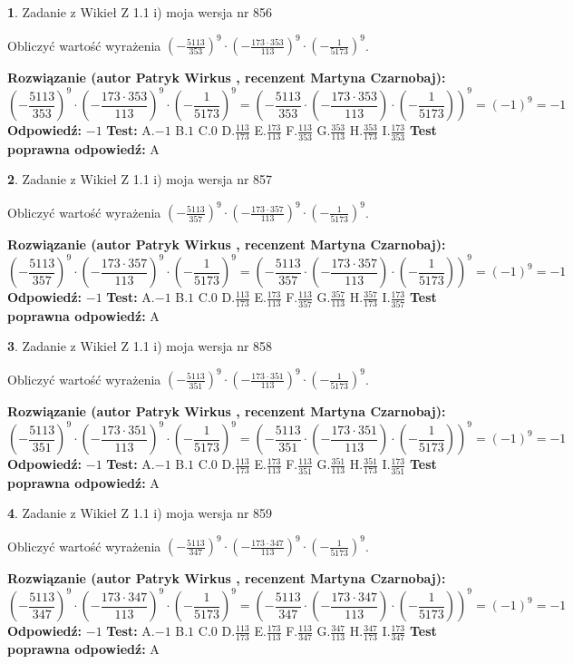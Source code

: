 \documentclass[12pt, a4paper]{article}
\theoremstyle{definition} %
\newtheorem{zad}{}
\newcommand{\zadStart}[1]{\begin{zad}#1\newline}
\newcommand{\zadStop}{\end{zad}}
\newcommand{\rozwStart}[2]{\noindent \textbf{Rozwiązanie (autor #1 , recenzent #2): }\newline}
\newcommand{\rozwStop}{\newline}
\newcommand{\odpStart}{\noindent \textbf{Odpowiedź:}\newline}
\newcommand{\odpStop}{\newline}
\newcommand{\testStart}{\noindent \textbf{Test:}\newline}
\newcommand{\testStop}{\newline}
\newcommand{\kluczStart}{\noindent \textbf{Test poprawna odpowiedź:}\newline}
\newcommand{\kluczStop}{\newline}
\begin{document}
\zadStart{Zadanie z Wikieł Z 1.1 i) moja wersja nr 856}

Obliczyć wartość wyrażenia $(-\frac{5113}{353})^{9} \cdot (-\frac{173 \cdot 353}{113})^{9} \cdot (-\frac{1}{5173})^{9}$.
\zadStop
\rozwStart{Patryk Wirkus}{Martyna Czarnobaj}
$$(-\frac{5113}{353})^{9} \cdot (-\frac{173 \cdot 353}{113})^{9} \cdot (-\frac{1}{5173})^{9} = (-\frac{5113}{353} \cdot (-\frac{173 \cdot 353}{113}) \cdot (-\frac{1}{5173}))^{9} = (-1)^{9} = -1$$
\rozwStop
\odpStart
$-1$
\odpStop
\testStart
A.$-1$ B.$1$ C.$0$ D.$\frac{113}{173}$ E.$\frac{173}{113}$
F.$\frac{113}{353}$ G.$\frac{353}{113}$
H.$\frac{353}{173}$
I.$\frac{173}{353}$
\testStop
\kluczStart
A
\kluczStop



\zadStart{Zadanie z Wikieł Z 1.1 i) moja wersja nr 857}

Obliczyć wartość wyrażenia $(-\frac{5113}{357})^{9} \cdot (-\frac{173 \cdot 357}{113})^{9} \cdot (-\frac{1}{5173})^{9}$.
\zadStop
\rozwStart{Patryk Wirkus}{Martyna Czarnobaj}
$$(-\frac{5113}{357})^{9} \cdot (-\frac{173 \cdot 357}{113})^{9} \cdot (-\frac{1}{5173})^{9} = (-\frac{5113}{357} \cdot (-\frac{173 \cdot 357}{113}) \cdot (-\frac{1}{5173}))^{9} = (-1)^{9} = -1$$
\rozwStop
\odpStart
$-1$
\odpStop
\testStart
A.$-1$ B.$1$ C.$0$ D.$\frac{113}{173}$ E.$\frac{173}{113}$
F.$\frac{113}{357}$ G.$\frac{357}{113}$
H.$\frac{357}{173}$
I.$\frac{173}{357}$
\testStop
\kluczStart
A
\kluczStop



\zadStart{Zadanie z Wikieł Z 1.1 i) moja wersja nr 858}

Obliczyć wartość wyrażenia $(-\frac{5113}{351})^{9} \cdot (-\frac{173 \cdot 351}{113})^{9} \cdot (-\frac{1}{5173})^{9}$.
\zadStop
\rozwStart{Patryk Wirkus}{Martyna Czarnobaj}
$$(-\frac{5113}{351})^{9} \cdot (-\frac{173 \cdot 351}{113})^{9} \cdot (-\frac{1}{5173})^{9} = (-\frac{5113}{351} \cdot (-\frac{173 \cdot 351}{113}) \cdot (-\frac{1}{5173}))^{9} = (-1)^{9} = -1$$
\rozwStop
\odpStart
$-1$
\odpStop
\testStart
A.$-1$ B.$1$ C.$0$ D.$\frac{113}{173}$ E.$\frac{173}{113}$
F.$\frac{113}{351}$ G.$\frac{351}{113}$
H.$\frac{351}{173}$
I.$\frac{173}{351}$
\testStop
\kluczStart
A
\kluczStop



\zadStart{Zadanie z Wikieł Z 1.1 i) moja wersja nr 859}

Obliczyć wartość wyrażenia $(-\frac{5113}{347})^{9} \cdot (-\frac{173 \cdot 347}{113})^{9} \cdot (-\frac{1}{5173})^{9}$.
\zadStop
\rozwStart{Patryk Wirkus}{Martyna Czarnobaj}
$$(-\frac{5113}{347})^{9} \cdot (-\frac{173 \cdot 347}{113})^{9} \cdot (-\frac{1}{5173})^{9} = (-\frac{5113}{347} \cdot (-\frac{173 \cdot 347}{113}) \cdot (-\frac{1}{5173}))^{9} = (-1)^{9} = -1$$
\rozwStop
\odpStart
$-1$
\odpStop
\testStart
A.$-1$ B.$1$ C.$0$ D.$\frac{113}{173}$ E.$\frac{173}{113}$
F.$\frac{113}{347}$ G.$\frac{347}{113}$
H.$\frac{347}{173}$
I.$\frac{173}{347}$
\testStop
\kluczStart
A
\kluczStop
\end{document}

